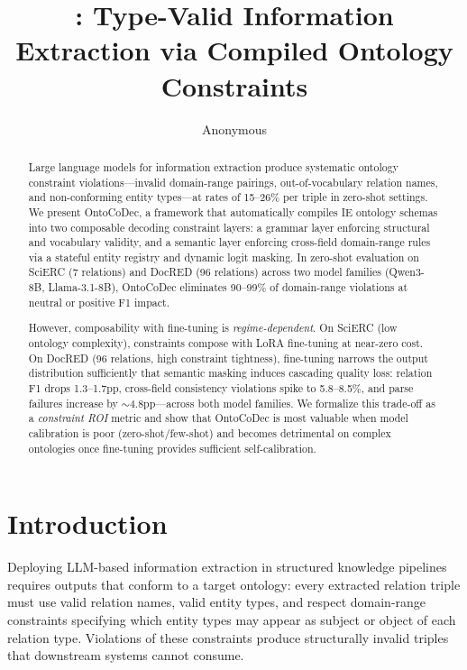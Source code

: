 \documentclass[11pt,a4paper]{article}
\title{\system{}: Type-Valid Information Extraction via Compiled Ontology Constraints}
\author{Anonymous}
\newcommand{\system}{OntoCoDec}
\begin{document}
\maketitle

\begin{abstract}
Large language models for information extraction produce systematic ontology constraint violations---invalid domain-range pairings, out-of-vocabulary relation names, and non-conforming entity types---at rates of 15--26\% per triple in zero-shot settings. We present \system{}, a framework that automatically compiles IE ontology schemas into two composable decoding constraint layers: a grammar layer enforcing structural and vocabulary validity, and a semantic layer enforcing cross-field domain-range rules via a stateful entity registry and dynamic logit masking. In zero-shot evaluation on SciERC (7 relations) and DocRED (96 relations) across two model families (Qwen3-8B, Llama-3.1-8B), \system{} eliminates 90--99\% of domain-range violations at neutral or positive F1 impact.

However, composability with fine-tuning is \emph{regime-dependent}. On SciERC (low ontology complexity), constraints compose with LoRA fine-tuning at near-zero cost. On DocRED (96 relations, high constraint tightness), fine-tuning narrows the output distribution sufficiently that semantic masking induces cascading quality loss: relation F1 drops 1.3--1.7pp, cross-field consistency violations spike to 5.8--8.5\%, and parse failures increase by $\sim$4.8pp---across both model families. We formalize this trade-off as a \emph{constraint ROI} metric and show that \system{} is most valuable when model calibration is poor (zero-shot/few-shot) and becomes detrimental on complex ontologies once fine-tuning provides sufficient self-calibration.
\end{abstract}

\section{Introduction}

Deploying LLM-based information extraction in structured knowledge pipelines requires outputs that conform to a target ontology: every extracted relation triple must use valid relation names, valid entity types, and respect domain-range constraints specifying which entity types may appear as subject or object of each relation type. Violations of these constraints produce structurally invalid triples that downstream systems cannot consume.
\end{document}
